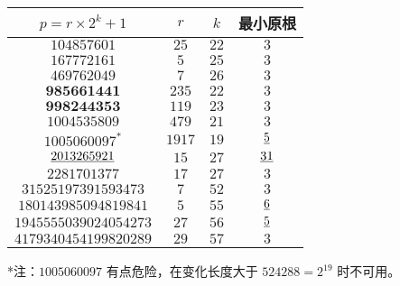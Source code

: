 \begin{tabular}{|c|c|c|c|}
	\hline $p = r \times 2 ^ k + 1$ &  $r$  & $k$  & 最小原根 \\
	\hline $104857601$              &  $25$ & $22$ & $3$ \\
	\hline $167772161$              &  $5$  & $25$ & $3$ \\
     \hline $469762049$      &  $7$   &  $26$  &    $3$ \\
     \hline $\mathbf{985661441}$      & $235$  &  $22$  &    $3$ \\
  \hline $\mathbf{998244353}$    & $119$  &  $23$  &    $3$ \\
  \hline $1004535809$    & $479$  &  $21$  &    $3$ \\
  \hline $1005060097 ^ *$      & $1917$ &  $19$  &  $\emph{5}$ \\
  \hline $\emph{2013265921}$    &  $15$  &  $27$  &  $\emph{31}$ \\
    \hline $2281701377$      &  $17$  &  $27$  &    $3$ \\
 \hline $31525197391593473$  &  $7$   &  $52$  &    $3$ \\
\hline $180143985094819841$  &  $5$   &  $55$  &  $\emph{6}$ \\
\hline $1945555039024054273$ &  $27$  &  $56$  &  $\emph{5}$ \\
\hline $4179340454199820289$ &  $29$  &  $57$  &    $3$ \\
\hline
\end{tabular}

*注：$1005060097$ 有点危险，在变化长度大于 $524288 = 2 ^ {19}$ 时不可用。
